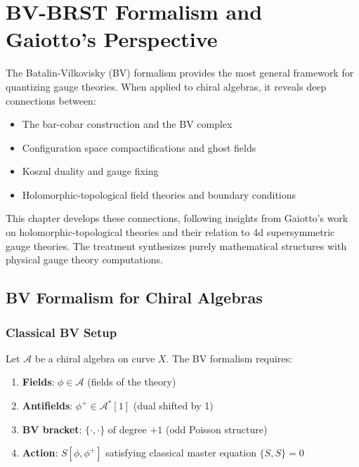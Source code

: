 \chapter{BV-BRST Formalism and Gaiotto's Perspective}
\label{ch:bv-brst}

\begin{remark}
The Batalin-Vilkovisky (BV) formalism provides the most general framework for 
quantizing gauge theories. When applied to chiral algebras, it reveals deep 
connections between:
\begin{itemize}
\item The bar-cobar construction and the BV complex
\item Configuration space compactifications and ghost fields
\item Koszul duality and gauge fixing
\item Holomorphic-topological field theories and boundary conditions
\end{itemize}

This chapter develops these connections, following insights from Gaiotto's work on 
holomorphic-topological theories and their relation to 4d supersymmetric gauge 
theories. The treatment synthesizes purely mathematical structures with physical 
gauge theory computations.
\end{remark}

\section{BV Formalism for Chiral Algebras}

\subsection{Classical BV Setup}

\begin{definition}
Let $\mathcal{A}$ be a chiral algebra on curve $X$. The BV formalism requires:
\begin{enumerate}
\item \textbf{Fields}: $\phi \in \mathcal{A}$ (fields of the theory)
\item \textbf{Antifields}: $\phi^+ \in \mathcal{A}^*[1]$ (dual shifted by 1)
\item \textbf{BV bracket}: $\{\cdot, \cdot\}$ of degree $+1$ (odd Poisson structure)
\item \textbf{Action}: $S[\phi, \phi^+]$ satisfying classical master equation 
$\{S, S\} = 0$
\end{enumerate}
\end{definition}

